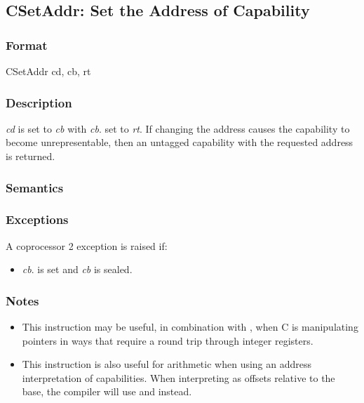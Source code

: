 \clearpage
{}
{}
\subsection*{CSetAddr: Set the Address of Capability}

\subsubsection*{Format}

CSetAddr cd, cb, rt

\begin{center}
\end{center}

\subsubsection*{Description}

\emph{cd} is set to \emph{cb} with \emph{cb}.\caddr{} set to \emph{rt}.
If changing the address causes the capability to become unrepresentable, then an untagged capability with the requested address is returned.

\subsubsection*{Semantics}


\subsubsection*{Exceptions}

A coprocessor 2 exception is raised if:

\begin{itemize}
\item
\emph{cb}.\ctag{} is set and \emph{cb} is sealed.
\end{itemize}

\subsubsection*{Notes}

\begin{itemize}
\item This instruction may be useful, in combination with , when C is manipulating pointers in ways that require a round trip through integer registers.
\item This instruction is also useful for  arithmetic when using an address interpretation of capabilities. When interpreting  as offsets relative
to the base, the compiler will use  and  instead.

\end{itemize}
